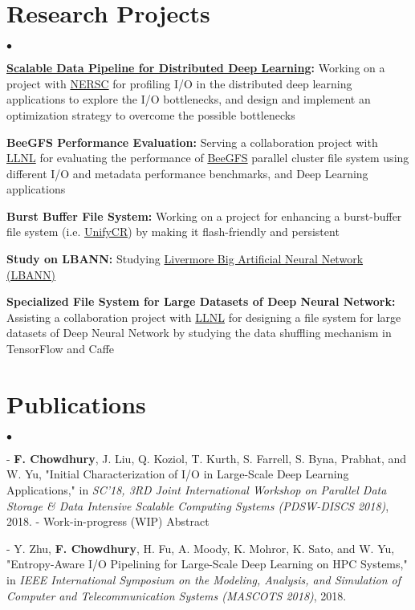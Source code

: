 \documentclass[margin,line]{res}
\newenvironment{list2}{
  \begin{list}{$\bullet$}{%
      \setlength{\itemsep}{0in}
      \setlength{\parsep}{0in} \setlength{\parskip}{0in}
      \setlength{\topsep}{0in} \setlength{\partopsep}{0in} 
      \setlength{\leftmargin}{0.2in}}}{\end{list}}
\begin{document}
\begin{resume}
\section{\sc Research Projects}
\begin{list2}
\item {\bf \href{https://github.com/NERSC/DL-Parallel-IO}{Scalable Data Pipeline for Distributed Deep Learning}:} Working on a project with \href{http://www.nersc.gov/}{NERSC} for profiling I/O in the distributed deep learning applications to explore the I/O bottlenecks, and design and implement an optimization strategy to overcome the possible bottlenecks
\item {\bf BeeGFS Performance Evaluation:} Serving a collaboration project with \href{https://www.llnl.gov/}{LLNL} for evaluating the performance of \href{https://www.beegfs.io/content/}{BeeGFS} parallel cluster file system using different I/O and metadata performance benchmarks, and Deep Learning applications
\item {\bf Burst Buffer File System:} Working on a project for enhancing a burst-buffer file system (i.e. \href{https://github.com/LLNL/UnifyCR}{UnifyCR}) by making it flash-friendly and persistent
\item {\bf Study on LBANN:} Studying \href{https://github.com/LLNL/lbann}{Livermore Big Artificial Neural Network (LBANN)}
\item {\bf Specialized File System for Large Datasets of Deep Neural Network:} Assisting a collaboration project with \href{https://www.llnl.gov/}{LLNL} for designing a file system for large datasets of Deep Neural Network by studying the data shuffling mechanism in TensorFlow and Caffe
\end{list2}

\vspace*{-.1in}

\section{\sc Publications}
\begin{list2}
\item[ - ] {\bf F. Chowdhury}, J. Liu, Q. Koziol, T. Kurth, S. Farrell, S. Byna, Prabhat, and W. Yu, "Initial Characterization of I/O in Large-Scale Deep Learning Applications," in \textit{SC'18, 3RD Joint International Workshop on Parallel Data Storage \& Data Intensive Scalable Computing Systems (PDSW-DISCS 2018)}, 2018. - Work-in-progress (WIP) Abstract
\item[ - ] Y. Zhu, {\bf F. Chowdhury}, H. Fu, A. Moody, K. Mohror, K. Sato, and W. Yu, "Entropy-Aware I/O Pipelining for Large-Scale Deep Learning on HPC Systems," in \textit{IEEE International Symposium on the Modeling, Analysis, and Simulation of Computer and Telecommunication Systems (MASCOTS 2018)}, 2018.
\end{list2}


\end{resume}
\end{document}
